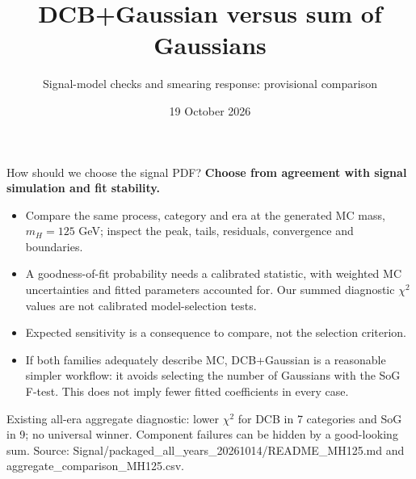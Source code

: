 \documentclass[aspectratio=169,10pt]{beamer}
\title{DCB+Gaussian versus sum of Gaussians}
\subtitle{Signal-model checks and smearing response: provisional comparison}
\date{19 October 2026}
\begin{document}
\begin{frame}{How should we choose the signal PDF?}
\textbf{Choose from agreement with signal simulation and fit stability.}
\begin{itemize}
\item Compare the same process, category and era at the generated MC mass, $m_H=125$ GeV; inspect the peak, tails, residuals, convergence and boundaries.
\item A goodness-of-fit probability needs a calibrated statistic, with weighted MC uncertainties and fitted parameters accounted for. Our summed diagnostic $\chi^2$ values are not calibrated model-selection tests.
\item Expected sensitivity is a consequence to compare, not the selection criterion.
\item If both families adequately describe MC, DCB+Gaussian is a reasonable simpler workflow: it avoids selecting the number of Gaussians with the SoG F-test. This does not imply fewer fitted coefficients in every case.
\end{itemize}
\small Existing all-era aggregate diagnostic: lower $\chi^2$ for DCB in 7 categories and SoG in 9; no universal winner. Component failures can be hidden by a good-looking sum.
\vfill\tiny Source: Signal/packaged\_all\_years\_20261014/README\_MH125.md and aggregate\_comparison\_MH125.csv.
\end{frame}
\end{document}
